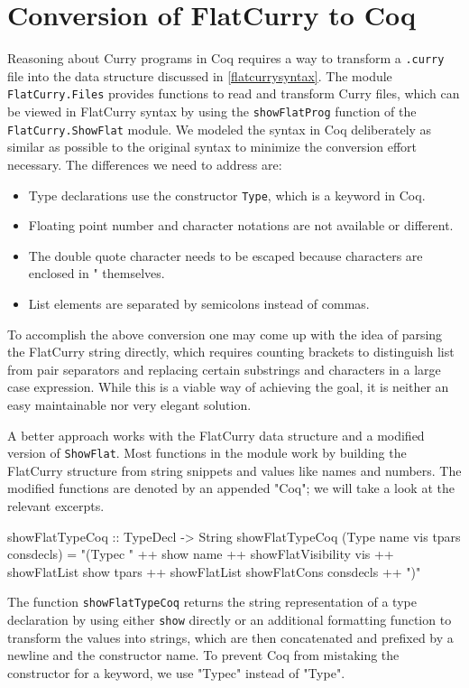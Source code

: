 \documentclass[paper = a4, fleqn, abstract=on, twoside]{scrreprt}
\newcommand{\coqinline}[1]{\texttt{#1}}
\begin{document}
\section{Conversion of FlatCurry to Coq}
\label{conversion}
Reasoning about Curry programs in Coq requires a way to transform a \texttt{.curry} file into the data structure discussed in \autoref{flatcurrysyntax}. The module \texttt{FlatCurry.Files} provides functions to read and transform Curry files, which can be viewed in FlatCurry syntax by using the \texttt{showFlatProg} function of the \texttt{FlatCurry.ShowFlat} module. We modeled the syntax in Coq deliberately as similar as possible to the original syntax to minimize the conversion effort necessary. The differences we need to address are:
\begin{itemize}
	\item Type declarations use the constructor \coqinline{Type}, which is a keyword in Coq.
	\item Floating point number and character notations are not available or different.
	\item The double quote character needs to be escaped because characters are enclosed in " themselves.
	\item List elements are separated by semicolons instead of commas.
\end{itemize}
To accomplish the above conversion one may come up with the idea of parsing the FlatCurry string directly, which requires counting brackets to distinguish list from pair separators and replacing certain substrings and characters in a large case expression. While this is a viable way of achieving the goal, it is neither an easy maintainable nor very elegant solution.
\par
A better approach works with the FlatCurry data structure and a modified version of \texttt{ShowFlat}. Most functions in the module work by building the FlatCurry structure from string snippets and values like names and numbers. The modified functions are denoted by an appended "Coq"; we will take a look at the relevant excerpts.
\begin{haskellcode}
showFlatTypeCoq :: TypeDecl -> String
showFlatTypeCoq (Type name vis tpars consdecls) =
  "\n  (Typec " ++ show name ++ showFlatVisibility vis
                ++ showFlatList show tpars
                ++ showFlatList showFlatCons consdecls ++ ")"
\end{haskellcode}
The function \texttt{showFlatTypeCoq} returns the string representation of a type declaration by using either \texttt{show} directly or an additional formatting function to transform the values into strings, which are then concatenated and prefixed by a newline and the constructor name. To prevent Coq from mistaking the constructor for a keyword,  we use "Typec" instead of "Type". 
\end{document}
